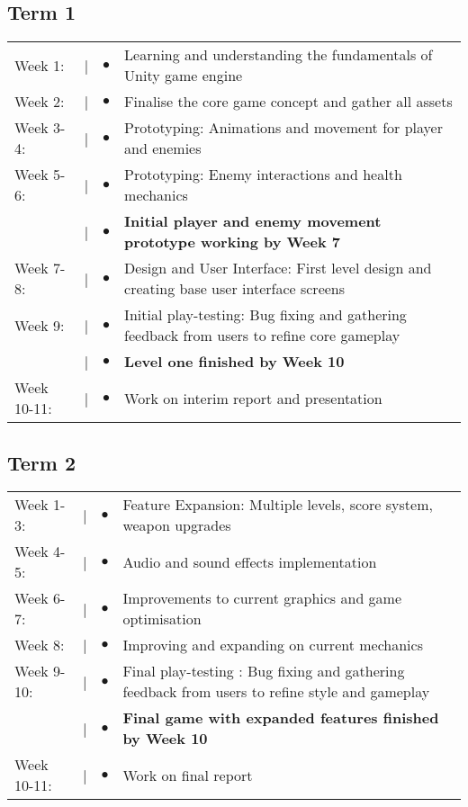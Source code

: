 \documentclass[]{final_report}
\begin{document}
\subsection{Term 1}
\begin{tabular}{@{}p{2cm}@{}>{\raggedright\arraybackslash}p{0.5cm}@{}>{\raggedright\arraybackslash}p{0.5cm}@{}p{12cm}}
Week 1: & \textcolor{black}{|} & $\bullet$ & Learning and understanding the fundamentals of Unity game engine \\
Week 2: & \textcolor{black}{|} & $\bullet$ & Finalise the core game concept and gather all assets \\
Week 3-4: & \textcolor{black}{|} & $\bullet$ & Prototyping: Animations and movement for player and enemies\\
Week 5-6: & \textcolor{black}{|} & $\bullet$ &  Prototyping: Enemy interactions and health mechanics \\
& \textcolor{black}{|} & $\bullet$ & \textbf{Initial player and enemy movement prototype working by Week 7} \\
Week 7-8: & \textcolor{black}{|} & $\bullet$ & Design and User Interface: First level design and creating base user interface screens\\
Week 9: & \textcolor{black}{|} & $\bullet$ & Initial play-testing: Bug fixing and gathering feedback from users to refine core gameplay\\
& \textcolor{black}{|} & $\bullet$ & \textbf{Level one finished by Week 10} \\
Week 10-11: & \textcolor{black}{|} & $\bullet$ & Work on interim report and presentation \\
\end{tabular}

\subsection{Term 2}
\begin{tabular}{@{}p{2cm}@{}>{\raggedright\arraybackslash}p{0.5cm}@{}>{\raggedright\arraybackslash}p{0.5cm}@{}p{12cm}}
Week 1-3: & \textcolor{black}{|} & $\bullet$ & Feature Expansion: Multiple levels, score system, weapon upgrades\\
Week 4-5: & \textcolor{black}{|} & $\bullet$ & Audio and sound effects implementation \\
Week 6-7: & \textcolor{black}{|} & $\bullet$ &  Improvements to current graphics and game optimisation \\
Week 8: & \textcolor{black}{|} & $\bullet$ & Improving and expanding on current mechanics \\
Week 9-10: & \textcolor{black}{|} & $\bullet$ & Final play-testing : Bug fixing and gathering feedback from users to refine style and gameplay\\
& \textcolor{black}{|} & $\bullet$ & \textbf{Final game with expanded features finished by Week 10} \\
Week 10-11: & \textcolor{black}{|} & $\bullet$ & Work on final report \\
\end{tabular}
\end{document}
